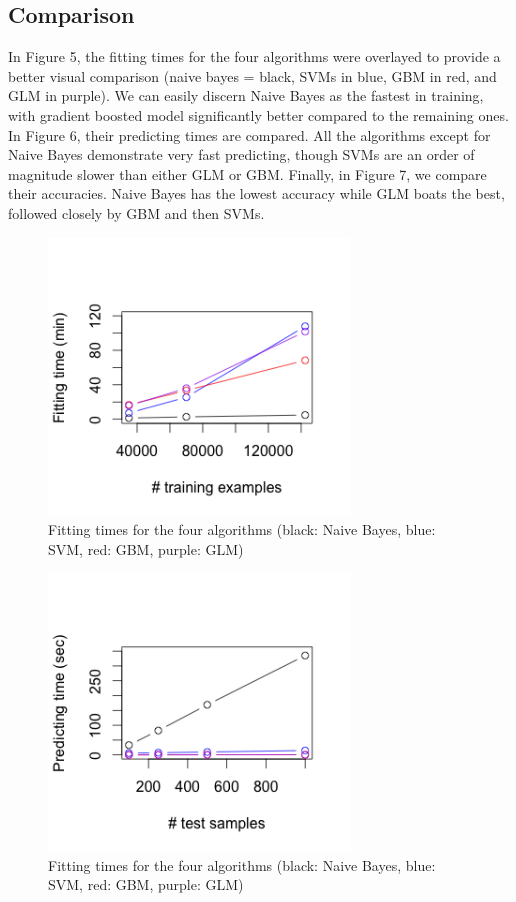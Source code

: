 \documentclass[twoside]{article}
\begin{document}
\begin{multicols}{2}
\subsection{Comparison}
In Figure 5, the fitting times for the four algorithms were overlayed to provide a better visual comparison (naive bayes = black, SVMs in blue, GBM in red, and GLM in purple). We can easily discern Naive Bayes as the fastest in training, with gradient boosted model significantly better compared to the remaining ones. In Figure 6, their predicting times are compared. All the algorithms except for Naive Bayes demonstrate very fast predicting, though SVMs are an order of magnitude slower than either GLM or GBM. Finally, in Figure 7, we compare their accuracies. Naive Bayes has the lowest accuracy while GLM boats the best, followed closely by GBM and then SVMs. 

\begin{figure}[H]
 \caption{Fitting times for the four algorithms (black: Naive Bayes, blue: SVM, red: GBM, purple: GLM)}
  \centering
    \includegraphics[width=8cm]{../data/all_fit}
\end{figure}

\begin{figure}[H]
 \caption{Fitting times for the four algorithms (black: Naive Bayes, blue: SVM, red: GBM, purple: GLM)}
  \centering
    \includegraphics[width=8cm]{../data/all_pred}
\end{figure}


\end{multicols}
\end{document}
